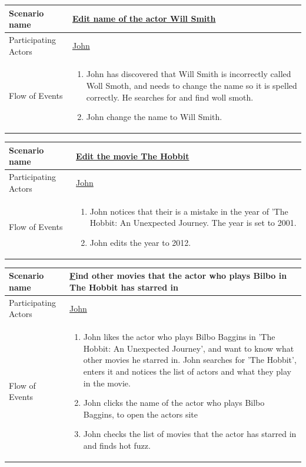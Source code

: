 \begin{center}
	\begin{tabular}{ | l | p{10cm} |  }
		 \hline
		Scenario name & \underline{Edit name of the actor Will Smith}  \\ \hline
		Participating Actors & \underline{John} \\ \hline
		Flow of Events & \begin{enumerate}
						\item John has discovered that Will Smith is incorrectly called Woll Smoth, and needs to change the name so it is spelled correctly. He searches for and find woll smoth.
						\item John change the name to Will Smith.
						\end{enumerate}
						\\ \hline
						
	\end{tabular}
\end{center}

\begin{center}
	\begin{tabular}{ | l | p{10cm} |  }
		 \hline
		Scenario name & \underline{Edit the movie The Hobbit}  \\ \hline
		Participating Actors & \underline{John} \\ \hline
		Flow of Events & \begin{enumerate}
						\item John notices that their is a mistake in the year of 'The Hobbit: An Unexpected Journey. The year is set to 2001.
						\item John edits the year to 2012.
						\end{enumerate}
						\\ \hline
						
	\end{tabular}
\end{center}

\begin{center}
	\begin{tabular}{ | l | p{10cm} |  }
		 \hline
		Scenario name & \underline Find other movies that the actor who plays Bilbo in The Hobbit has starred in  \\ \hline
		Participating Actors & \underline{John} \\ \hline
		Flow of Events & \begin{enumerate}
						\item John likes the actor who plays Bilbo Baggins in 'The Hobbit: An Unexpected Journey', and want to know what other movies he starred in.
						John searches for 'The Hobbit', enters it and notices the list of actors and what they play in the movie.
						\item John clicks the name of the actor who plays Bilbo Baggins, to open the actors site
						\item John checks the list of movies that the actor has starred in and finds hot fuzz.
						\end{enumerate}
						\\ \hline
	\end{tabular}
\end{center}


